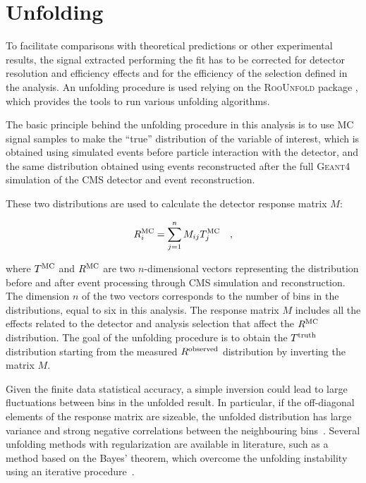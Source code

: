 \section{Unfolding}
\label{sec:Unfolding}

To facilitate comparisons with theoretical predictions or other experimental results, the signal
extracted performing the fit has to be corrected for detector resolution and
efficiency effects and for the efficiency of the selection defined in the
analysis.
An unfolding procedure is used relying on the \textsc{RooUnfold} package
\cite{Adye:2011gm}, which provides the tools to run various unfolding
algorithms.

The basic principle behind the unfolding procedure in this analysis is to use MC signal samples
to make the ``true'' distribution of the variable of interest, which is obtained using simulated events before particle interaction with the detector, and the same distribution obtained using events reconstructed after the full \textsc{Geant4} simulation of the CMS detector
and event reconstruction. 

These two distributions are used to calculate the detector response matrix $M$:

\begin{equation}\label{eq:resp_matrix}
R_{i}^{\rm {MC}} = \sum_{j=1}^{n} M_{ij}T_{j}^{\rm {MC}} \quad ,
\end{equation}

where $T^{\rm{MC}}$ and $R^{\rm{MC}}$ are two $n$-dimensional vectors
representing the distribution before and after event processing through CMS
simulation and reconstruction. The dimension $n$ of the two vectors corresponds 
to the number of bins in the distributions, equal to six in this analysis.
The response matrix $M$ includes all the effects related to the detector and analysis selection that affect the $R^{\rm{MC}}$ distribution.
The goal of the unfolding procedure is to obtain the $T^{\rm{truth}}$ distribution starting from the measured
$R^{\rm{observed}}$ distribution by inverting the matrix $M$.

Given the finite data statistical accuracy, a simple inversion could lead to large fluctuations between bins in the unfolded result. In particular, if the off-diagonal elements of the response matrix are sizeable, the unfolded distribution has large variance and strong negative correlations between the neighbouring bins~\cite{Cowan:2002in}. Several unfolding methods with regularization are available in literature, such as a method based on the Bayes' theorem, which overcome  the unfolding instability using an iterative procedure~\cite{DAgostini:1994zf}.

